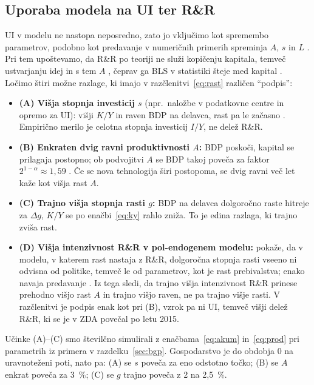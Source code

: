 \documentclass[12pt,a4paper]{article}
\begin{document}
\subsection{Uporaba modela na UI ter R\&R}\label{sec:uporabamodela}
UI v modelu ne nastopa neposredno, zato jo vključimo kot spremembo parametrov, podobno kot predavanje v numeričnih primerih spreminja $A$, $s$ in $L$ \parencites[pros.~45--48]{grobovsek2026}[str.~117--122]{garin2021}. Pri tem upoštevamo, da R\&R po teoriji ne služi kopičenju kapitala, temveč ustvarjanju idej in s tem $A$ \parencite[pros.~124]{grobovsek2026}, čeprav ga BLS v statistiki šteje med kapital \parencite{bls2026tfp}. Ločimo štiri možne razlage, ki imajo v razčlenitvi~\eqref{eq:rast} različen \enquote{podpis}:
\begin{itemize}
    \item \textbf{(A) Višja stopnja investicij $s$} (npr.\ naložbe v podatkovne centre in opremo za UI): višji $K/Y$ in raven BDP na delavca, rast pa le začasno \parencites[pros.~35,~47]{grobovsek2026}[str.~117--120]{garin2021}. Empirično merilo je celotna stopnja investicij $I/Y$, ne delež R\&R.
    \item \textbf{(B) Enkraten dvig ravni produktivnosti $A$:} BDP poskoči, kapital se prilagaja postopno; ob podvojitvi $A$ se BDP takoj poveča za faktor $2^{1-\alpha}\approx1{,}59$ \parencites[pros.~46]{grobovsek2026}[str.~120--122]{garin2021}. Če se nova tehnologija širi postopoma, se dvig ravni več let kaže kot višja rast $A$.
    \item \textbf{(C) Trajno višja stopnja rasti $g$:} BDP na delavca dolgoročno raste hitreje za $\Delta g$, $K/Y$ se po enačbi~\eqref{eq:ky} rahlo zniža. To je edina razlaga, ki trajno zviša rast.
    \item \textbf{(D) Višja intenzivnost R\&R v pol-endogenem modelu:} \textcite{jones1995} pokaže, da v modelu, v katerem rast nastaja z R\&R, dolgoročna stopnja rasti vseeno ni odvisna od politike, temveč le od parametrov, kot je rast prebivalstva; enako navaja predavanje \parencite[pros.~136]{grobovsek2026}. Iz tega sledi, da trajno višja intenzivnost R\&R prinese prehodno višjo rast $A$ in trajno višjo raven, ne pa trajno višje rasti. V razčlenitvi je podpis enak kot pri (B), vzrok pa ni UI, temveč višji delež R\&R, ki se je v ZDA povečal po letu 2015.
\end{itemize}

Učinke (A)--(C) smo številčno simulirali z enačbama~\eqref{eq:akum} in~\eqref{eq:prod} pri parametrih iz primera v razdelku~\ref{sec:bgp}. Gospodarstvo je do obdobja 0 na uravnoteženi poti, nato pa: (A) se $s$ poveča za eno odstotno točko; (B) se $A$ enkrat poveča za 3~\%; (C) se $g$ trajno poveča z 2 na 2,5~\%.
\end{document}
